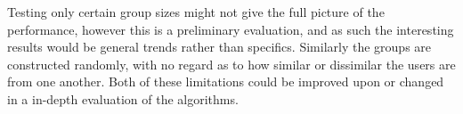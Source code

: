 Testing only certain group sizes might not give the full picture of the performance, however this is a preliminary evaluation, and as such the interesting results would be general trends rather than specifics. Similarly the groups are constructed randomly, with no regard as to how similar or dissimilar the users are from one another. Both of these limitations could be improved upon or changed in a in-depth evaluation of the algorithms.